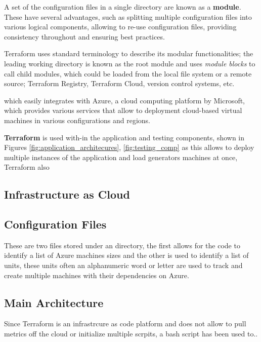 
A set of the configuration files in a single directory are known as a \textbf{module}. These have several advantages, such as splitting multiple configuration files into various logical components, allowing to re-use configuration files, providing consistency throughout and ensuring best practices. 

Terraform uses standard terminology to describe its modular functionalities; the leading working directory is known as the root module and uses \textit{module blocks} to call child modules, which could be loaded from the local file system or a remote source; Terraform Registry, Terraform Cloud, version control systems, etc.  



which easily integrates with Azure, a cloud computing platform by Microsoft, which provides various services that allow to deployment cloud-based virtual machines in various configurations and regions. 


\textbf{Terraform} is used with-in the application and testing components, shown in Figures  \ref{fig:application_architecures}, \ref{fig:testing_comp} as this allows to deploy multiple instances of the application and load generators machines at once, Terraform also 


\subsection{Infrastructure as Cloud}



\subsection{Configuration Files}
These are two files stored under an  directory, the first  allows for the code to identify a list of Azure machines sizes and the other  is used to identify a list of units, these units often an alphanumeric word or letter are used to track and create multiple machines with their dependencies on Azure.

\subsection{Main Architecture}
Since Terraform is an infrastrcure as code platform and does not allow to pull metrics off the cloud or initialize multiple scrpits, a bash script has been used to..

